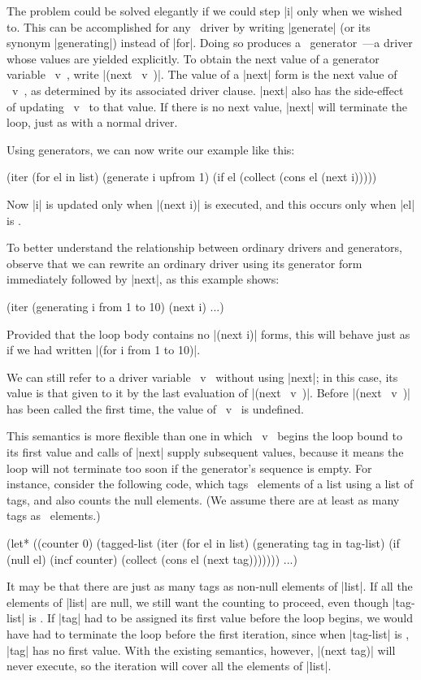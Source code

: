 The problem could be solved elegantly if we could step |i| only when
we wished to.  This
can be accomplished for any \iter\ driver by writing |generate| (or
its synonym |generating|)
instead of |for|.  Doing so produces a ~generator~---a driver whose
values are yielded explicitly.  To obtain the next value of a
generator variable ~v~, write \linebreak |(next ~v~)|.  The value of a |next|
form is the next value of ~v~, as determined by its associated driver
clause.  |next| also has the side-effect of updating ~v~ to that
value.  If there is no next value, |next| will terminate the loop,
just as with a normal driver.


Using generators, we can now write our example like this:
\begin{program}
(iter (for el in list)
      (generate i upfrom 1)
      (if el (collect (cons el (next i)))))
\end{program}
Now |i| is updated only when |(next i)| is executed, and this occurs
only when |el| is \nonnil.

To better understand the relationship between ordinary drivers and
generators, observe that we can rewrite an ordinary driver using its
generator form immediately followed by |next|, as this example shows:
\begin{program}
(iter (generating i from 1 to 10)
      (next i)
      ...)
\end{program}
Provided that the loop body contains no |(next i)| forms, this will
behave just as if we had written |(for i from 1 to 10)|.

We can still refer to a driver variable ~v~ without using |next|; in
this case, its value is that given to it by the last evaluation of
|(next ~v~)|.  Before |(next ~v~)| has been called the first time, the
value of ~v~ is undefined.  

This semantics is more flexible than
one in which ~v~ begins the loop bound to its first value and calls
of |next| supply subsequent values, because it means the loop will not
terminate too soon if the generator's sequence is empty.  For
instance, consider the following code, which tags \nonnil\ elements of
a list using a list of tags, and also counts the null elements.
(We assume there are at least as many tags as \nonnil\ elements.)
\begin{program}
(let* ((counter 0)
       (tagged-list (iter (for el in list)
                          (generating tag in tag-list) 
                          (if (null el)
                              (incf counter)
                              (collect (cons el (next tag)))))))
  ...)
\end{program}
It may be that there are just as many tags as non-null elements of
|list|.  If all the elements of |list| are null, we still want the
counting to proceed, even though |tag-list| is \nil.  If |tag| had to be
assigned its first value before the loop begins, we would have had to
terminate the loop before the first iteration, since when |tag-list|
is \nil, |tag| 
has no first value.  With the existing semantics, however, |(next
tag)| will never execute, so the iteration will cover all the elements of
|list|. 
        
